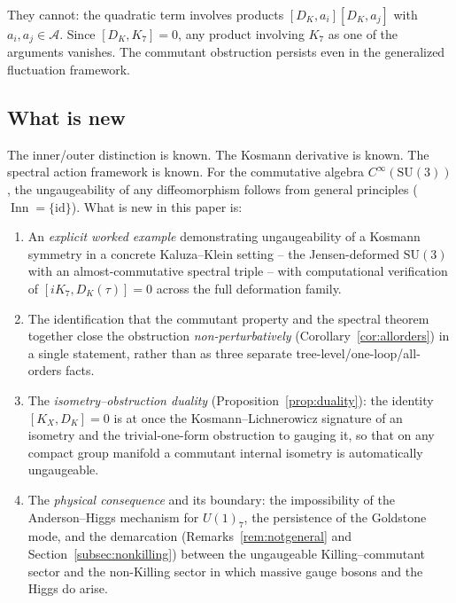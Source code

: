 \documentclass[12pt]{article}
\theoremstyle{definition}
\theoremstyle{remark}
\newcommand{\Alg}{\mathcal{A}}
\newcommand{\Inn}{\operatorname{Inn}}
\begin{document}
They cannot: the quadratic term involves products $[D_K, a_i][D_K, a_j]$ with $a_i, a_j \in \Alg$.  Since $[D_K, K_7] = 0$, any product involving $K_7$ as one of the arguments vanishes.  The commutant obstruction persists even in the generalized fluctuation framework.

\subsection{What is new}
\label{subsec:whatisnew}

The inner/outer distinction is known.  The Kosmann derivative is known.  The spectral action framework is known.  For the commutative algebra $C^\infty(\mathrm{SU}(3))$, the ungaugeability of any diffeomorphism follows from general principles ($\Inn = \{\mathrm{id}\}$).  What is new in this paper is:

\begin{enumerate}
  \item An \emph{explicit worked example} demonstrating ungaugeability of a Kosmann symmetry in a concrete Kaluza--Klein setting -- the Jensen-deformed $\mathrm{SU}(3)$ with an almost-commutative spectral triple -- with computational verification of $[iK_7, D_K(\tau)] = 0$ across the full deformation family.

  \item The identification that the commutant property and the spectral theorem together close the obstruction \emph{non-perturbatively} (Corollary~\ref{cor:allorders}) in a single statement, rather than as three separate tree-level/one-loop/all-orders facts.

  \item The \emph{isometry--obstruction duality} (Proposition~\ref{prop:duality}): the identity $[K_X, D_K] = 0$ is at once the Kosmann--Lichnerowicz signature of an isometry and the trivial-one-form obstruction to gauging it, so that on any compact group manifold a commutant internal isometry is automatically ungaugeable.

  \item The \emph{physical consequence} and its boundary: the impossibility of the Anderson--Higgs mechanism for $U(1)_7$, the persistence of the Goldstone mode, and the demarcation (Remarks~\ref{rem:notgeneral} and Section~\ref{subsec:nonkilling}) between the ungaugeable Killing--commutant sector and the non-Killing sector in which massive gauge bosons and the Higgs do arise.
\end{enumerate}
\end{document}
